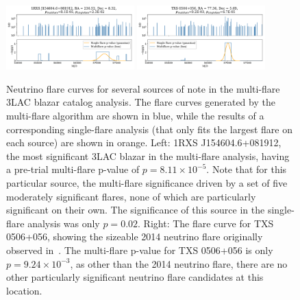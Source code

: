 \begin{figure}[h]
\centering
\includegraphics[width=0.44\textwidth]{figs/1RXS J154604.6+081912.pdf}
\includegraphics[width=0.44\textwidth]{figs/TXS 0506+056.pdf}
\caption{Neutrino flare curves for several sources of note in the multi-flare 3LAC blazar catalog analysis. The flare curves generated by the multi-flare algorithm are shown in blue, while the results of a corresponding single-flare analysis (that only fits the largest flare on each source) are shown in orange. Left: 1RXS J154604.6+081912, the most significant 3LAC blazar in the multi-flare analysis, having a pre-trial multi-flare p-value of $p=8.11 \times 10^{-5}$. Note that for this particular source, the multi-flare significance driven by a set of five moderately significant flares, none of which are particularly significant on their own. The significance of this source in the single-flare analysis was only $p=0.02$. Right: The flare curve for TXS 0506+056, showing the sizeable 2014 neutrino flare originally observed in~\cite{TXS_Archival}. The multi-flare p-value for TXS 0506+056 is only $p=9.24 \times 10^{-3}$, as other than the 2014 neutrino flare, there are no other particularly significant neutrino flare candidates at this location. }
\label{fig:3lacflarecurves}
\end{figure}

